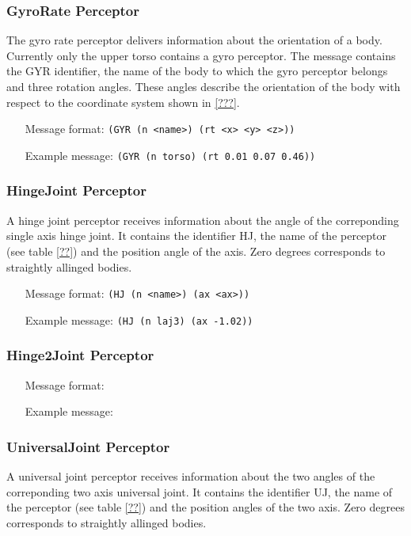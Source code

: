 \subsubsection{GyroRate Perceptor}
The gyro rate perceptor delivers information about the orientation of a body.
Currently only the upper torso contains a gyro perceptor.
The message contains the GYR identifier, the name of the body to which the gyro
perceptor belongs and three rotation angles. These angles describe the
orientation of the body with respect to the coordinate system shown in
\ref{???}.\newline \newline
\begin{itemize}
	\item[Message format:] \texttt{(GYR (n <name>) (rt <x> <y> <z>))}
	\item[Example message:] \texttt{(GYR (n torso) (rt 0.01 0.07 0.46))}
\end{itemize}


\subsubsection{HingeJoint Perceptor}
A hinge joint perceptor receives information about the angle of the
correponding single axis hinge joint. It contains the identifier HJ, the name
of the perceptor (see table \ref{??}) and the position angle of the axis. Zero
degrees corresponds to straightly allinged bodies.
\begin{itemize}
	\item[Message format:] \texttt{(HJ (n <name>) (ax <ax>))}
	\item[Example message:] \texttt{(HJ (n laj3) (ax -1.02))}
\end{itemize}

\subsubsection{Hinge2Joint Perceptor}
\begin{itemize}
	\item[Message format:] \texttt{}
	\item[Example message:] \texttt{}
\end{itemize}

\subsubsection{UniversalJoint Perceptor}
A universal joint perceptor receives information about the two angles of the
correponding two axis universal joint. It contains the identifier UJ, the name
of the perceptor (see table \ref{??}) and the position angles of the two axis.
Zero degrees corresponds to straightly allinged bodies.
 
